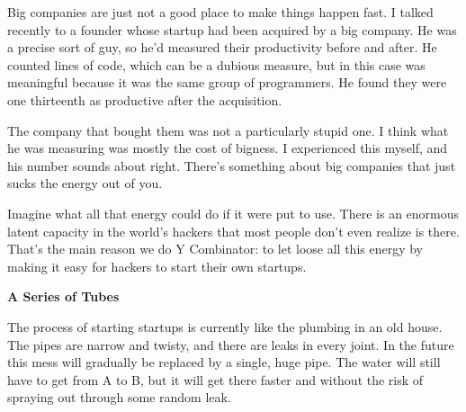 Big companies are just not a
                    good place to make things happen fast. I talked recently to
                    a founder whose startup had been acquired by a big company.
                    He was a precise sort of guy, so he'd measured their
                    productivity before and after. He counted lines of code,
                    which can be a dubious measure, but in this case was
                    meaningful because it was the same group of programmers. He
                    found they were one thirteenth as productive after the
                    acquisition.

The company that bought them was not
                    a particularly stupid one. I think what he was measuring was
                    mostly the cost of bigness. I experienced this myself, and
                    his number sounds about right. There's something about big
                    companies that just sucks the energy out of you.

Imagine
                    what all that energy could do if it were put to use. There
                    is an enormous latent capacity in the world's hackers that
                    most people don't even realize is there. That's the main
                    reason we do Y Combinator: to let loose all this energy by
                    making it easy for hackers to start their own startups.

\textbf{A Series of Tubes}

The process of starting startups is currently
                    like the plumbing in an old house. The pipes are narrow and
                    twisty, and there are leaks in every joint. In the future
                    this mess will gradually be replaced by a single, huge pipe.
                    The water will still have to get from A to B, but it will
                    get there faster and without the risk of spraying out
                    through some random leak.

